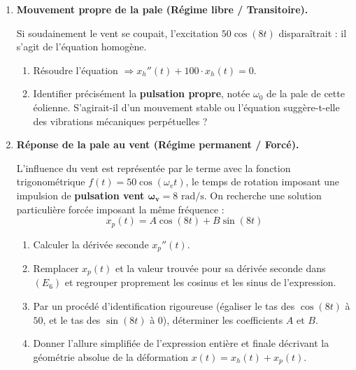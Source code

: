 \documentclass[a4paper,11pt]{article}
\begin{document}
\begin{enumerate}
    \item \textbf{Mouvement propre de la pale (Régime libre / Transitoire).}
    
    Si soudainement le vent se coupait, l'excitation $50\cos(8t)$ disparaîtrait : il s'agit de l'équation homogène.
    \begin{enumerate}
        \item Résoudre l'équation $\Rightarrow x_h''(t) + 100 \cdot x_h(t) = 0$.
        \vspace{2.5cm}
        \item Identifier précisément la \textbf{pulsation propre}, notée $\omega_0$ de la pale de cette éolienne. S'agirait-il d'un mouvement stable ou l'équation suggère-t-elle des vibrations mécaniques perpétuelles ?
        \vspace{2.5cm}
    \end{enumerate}

    \item \textbf{Réponse de la pale au vent (Régime permanent / Forcé).}
    
    L'influence du vent est représentée par le terme avec la fonction trigonométrique $f(t) = 50\cos(\omega_v t)$, le temps de rotation imposant une impulsion de \textbf{pulsation vent $\boldsymbol{\omega_v} = 8 \text{ rad/s}$}.
    On recherche une solution particulière forcée imposant la même fréquence :
    \[
    x_p(t) = A\cos(8t) + B\sin(8t)
    \]
    \begin{enumerate}
        \item Calculer la dérivée seconde $x_p''(t)$.
        \vspace{3.5cm}
        \item Remplacer $x_p(t)$ et la valeur trouvée pour sa dérivée seconde dans $(E_6)$ et regrouper proprement les cosinus et les sinus de l'expression.
        \vspace{3.5cm}
        \item Par un procédé d'identification rigoureuse (égaliser le tas des $\cos(8t)$ à $50$, et le tas des $\sin(8t)$ à $0$), déterminer les coefficients $A$ et $B$.
        \vspace{3cm}
        \item Donner l'allure simplifiée de l'expression entière et finale décrivant la géométrie absolue de la déformation $x(t) = x_h(t) + x_p(t)$.
        \vspace{2cm}
    \end{enumerate}


\end{enumerate}
\end{document}

